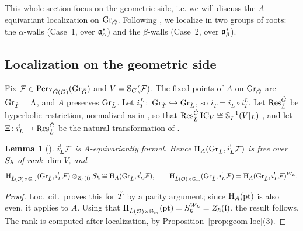 \documentclass{article}
\theoremstyle{plain}
\newtheorem{lemma}[theorem]{Lemma}
\theoremstyle{definition}
\theoremstyle{remark}
\numberwithin{equation}{section}
\begin{document}
This whole section focus on the geometric side, i.e. we will discuss the $A$-equivariant localization on $\operatorname{Gr}_{{\check{G}}}$.
Following \cite{macerato2023leviequivariantrestrictionsphericalperverse}, we localize in two groups of roots: the $\alpha$-walls (Case~1, over $\mathfrak{a}^*_{\alpha}$) and the $\beta$-walls (Case~2, over $\mathfrak{a}^*_{\beta}$).

\subsection{Localization on the geometric side}\label{sec:geom-loc}
Fix $\mathcal{F}\in\operatorname{Perv}_{{\check{G}}(\mathcal{O})}(\operatorname{Gr}_{{\check{G}}})$ and $V=\mathbb{S}_G(\mathcal{F})$. The fixed points of $A$ on $\operatorname{Gr}_{{\check{G}}}$ are $\operatorname{Gr}_{{\check{T}}}=\Lambda$, and $A$ preserves $\operatorname{Gr}_{\check{L}}$. Let $i_T^L\colon\operatorname{Gr}_{{\check{T}}}\hookrightarrow\operatorname{Gr}_{\check{L}}$, so $i_T=i_L\circ i_T^L$. Let $\operatorname{Res}^{{\check{G}}}_{\check{L}}$ be hyperbolic restriction, normalized as in \cite[\S\S1.2, 2.4]{macerato2023leviequivariantrestrictionsphericalperverse}, so that $\operatorname{Res}^{{\check{G}}}_{\check{L}}\operatorname{IC}_V\cong\mathbb{S}_L^{-1}(V|_L)$ \cite[Theorem 4.1.1]{macerato2023leviequivariantrestrictionsphericalperverse}, and let $\Xi\colon i_L^!\to\operatorname{Res}^{{\check{G}}}_{\check{L}}$ be the natural transformation of \cite[(1.3.1)]{macerato2023leviequivariantrestrictionsphericalperverse}.

\begin{lemma}[{\cite[Proposition 2.1.1]{macerato2023leviequivariantrestrictionsphericalperverse}}]\label{lem:formal}
$i_L^!\mathcal{F}$ is $A$-equivariantly formal. Hence $\mathrm{H}_A(\operatorname{Gr}_{\check{L}},i_L^!\mathcal{F})$ is free over $S_\hbar$ of rank $\dim V$, and
\[
\mathrm{H}_{\check{L}(\mathcal{O})\rtimes\mathbb{G}_m}(\operatorname{Gr}_{\check{L}},i_L^!\mathcal{F})\otimes_{Z_\hbar(\mathfrak{l})}S_\hbar\cong\mathrm{H}_A(\operatorname{Gr}_{\check{L}},i_L^!\mathcal{F}),\qquad \mathrm{H}_{\check{L}(\mathcal{O})\rtimes\mathbb{G}_m}(\operatorname{Gr}_{\check{L}},i_L^!\mathcal{F})=\mathrm{H}_A(\operatorname{Gr}_{\check{L}},i_L^!\mathcal{F})^{W_L}.
\]
\end{lemma}

\begin{proof}
Loc.\ cit.\ proves this for ${\check{T}}$ by a parity argument; since $\mathrm{H}_A(\mathrm{pt})$ is also even, it applies to $A$. Using that $\mathrm{H}_{\check{L}(\mathcal{O})\rtimes\mathbb{G}_m}(\mathrm{pt})=S_\hbar^{W_L}=Z_\hbar(\mathfrak{l})$, the result follows. The rank is computed after localization, by Proposition~\ref{prop:geom-loc}(3).
\end{proof}
\end{document}
